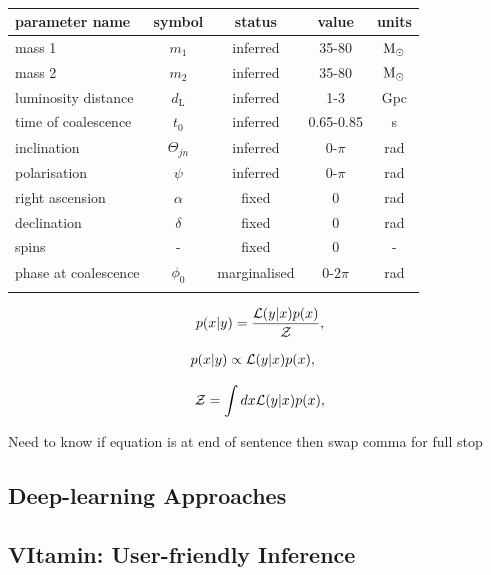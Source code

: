 \documentclass[aps,superscriptaddress,twocolumn,nopreprintnumbers,floatfix,groupedaddress]{revtex4-1}
\newcommand{\vitamin}{{\sc VItamin}\xspace}
\begin{document}
\begin{table}[t]
	\centering
	\caption{}
	\begin{tabular}[t]{lcccc}
		\toprule
		parameter name & symbol & status & value & units\\
		\hline
		mass 1 & $m_1$ & inferred  & 35-80 & \(\textup{M}_\odot\)\\
		mass 2 & $m_2$ & inferred & 35-80 & \(\textup{M}_\odot\)\\
		luminosity distance & $d_{\text{L}}$ & inferred & 1-3 & Gpc\\
		time of coalescence & $t_{0}$ & inferred & 0.65-0.85 & s\\
		inclination & $\Theta_{jn}$ & inferred & 0-$\pi$ & rad\\
		polarisation & $\psi$ & inferred & 0-$\pi$ & rad\\
		\hline
		right ascension & $\alpha$ & fixed & 0 & rad\\
		declination & $\delta$ & fixed & 0 & rad\\
		spins & - & fixed & 0 & -\\
		\hline
		phase at coalescence & $\phi_{0}$ & marginalised & 0-$2\pi$ & rad\\
		\botrule
	\end{tabular}
	\label{tab:prior_ranges}
\end{table}



\begin{align}\label{eq:bayes_exact} 
	p(x|y) = \frac{{\cal L}(y|x) p(x)}{\cal Z} ,
\end{align}

\begin{align}\label{eq:bayes_prop} 
	p(x|y) &\propto {\cal L}(y|x) p(x), 
\end{align}

\begin{align}\label{eq:bayes_evidence} 
{\cal Z} = \int dx {\cal L}(y|x) p(x) ,
\end{align}

Need to know if equation is at end of sentence then swap comma for full stop



\subsection{Deep-learning Approaches}

\subsection{\vitamin: User-friendly Inference}\label{vit}
\end{document}
